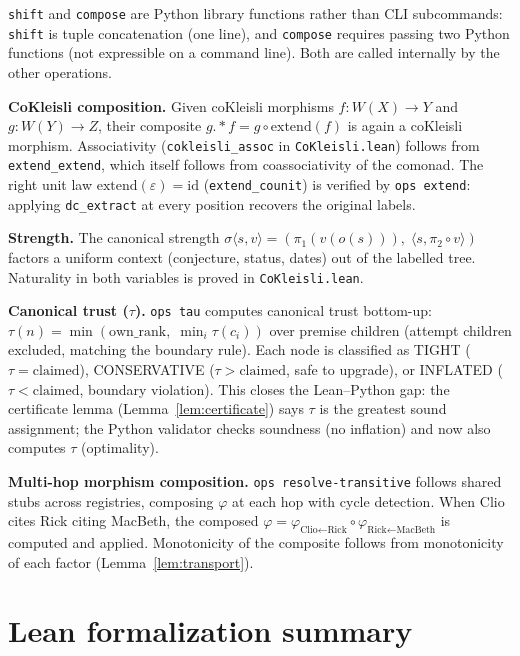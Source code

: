 \documentclass[11pt,a4paper]{article}
\theoremstyle{plain}
\theoremstyle{definition}
\begin{document}
\texttt{shift} and \texttt{compose} are Python library functions rather than
CLI subcommands: \texttt{shift} is tuple concatenation (one line), and
\texttt{compose} requires passing two Python functions (not expressible on a
command line). Both are called internally by the other operations.

\textbf{CoKleisli composition.} Given coKleisli morphisms $f : W(X) \to Y$ and
$g : W(Y) \to Z$, their composite $g \mathbin{.*} f = g \circ \mathrm{extend}(f)$
is again a coKleisli morphism. Associativity (\texttt{cokleisli\_assoc} in
\texttt{CoKleisli.lean}) follows from \texttt{extend\_extend}, which itself
follows from coassociativity of the comonad. The right unit law
$\mathrm{extend}(\varepsilon) = \mathrm{id}$ (\texttt{extend\_counit}) is
verified by \texttt{ops extend}: applying \texttt{dc\_extract} at every
position recovers the original labels.

\textbf{Strength.} The canonical strength $\sigma\langle s, v\rangle =
(\pi_1(v(o(s))),\; \langle s, \pi_2 \circ v\rangle)$ factors a uniform
context (conjecture, status, dates) out of the labelled tree. Naturality
in both variables is proved in \texttt{CoKleisli.lean}.

\textbf{Canonical trust ($\tau$).} \texttt{ops tau} computes canonical trust
bottom-up: $\tau(n) = \min(\mathrm{own\_rank},\; \min_i \tau(c_i))$ over
premise children (attempt children excluded, matching the boundary rule).
Each node is classified as TIGHT ($\tau = \text{claimed}$), CONSERVATIVE
($\tau > \text{claimed}$, safe to upgrade), or INFLATED ($\tau <
\text{claimed}$, boundary violation). This closes the Lean--Python gap:
the certificate lemma (Lemma~\ref{lem:certificate}) says $\tau$ is the
greatest sound assignment; the Python validator checks soundness
(no inflation) and now also computes $\tau$ (optimality).

\textbf{Multi-hop morphism composition.} \texttt{ops resolve-transitive}
follows shared stubs across registries, composing $\varphi$ at each hop
with cycle detection. When Clio cites Rick citing MacBeth, the composed
$\varphi = \varphi_{\text{Clio}\leftarrow\text{Rick}} \circ
\varphi_{\text{Rick}\leftarrow\text{MacBeth}}$ is computed and applied.
Monotonicity of the composite follows from monotonicity of each factor
(Lemma~\ref{lem:transport}).

\section{Lean formalization summary}
\label{sec:lean}
\end{document}
